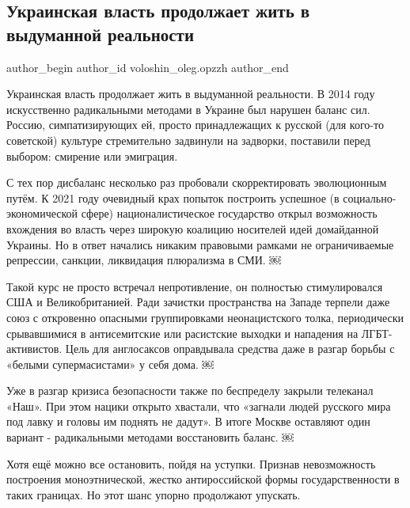  
 
 
 
 
 
\subsection{Украинская власть продолжает жить в выдуманной реальности}
\label{sec:18_02_2022.fb.voloshin_oleg.opzzh.1.ukrvlast_realnost}
 
\ifcmt
 author_begin
   author_id voloshin_oleg.opzzh
 author_end
\fi

Украинская власть продолжает жить в выдуманной реальности. В 2014 году
искусственно радикальными методами в Украине был нарушен баланс сил. Россию,
симпатизирующих ей, просто принадлежащих к русской (для кого-то советской)
культуре стремительно задвинули на задворки, поставили перед выбором: смирение
или эмиграция. 

С тех пор дисбаланс несколько раз пробовали скорректировать эволюционным путём.
К 2021 году очевидный крах попыток построить успешное (в
социально-экономической сфере) националистическое государство открыл
возможность вхождения во власть через широкую коалицию носителей идей
домайданной Украины. Но в ответ начались никаким правовыми рамками не
ограничиваемые репрессии, санкции, ликвидация плюрализма в СМИ. ￼

Такой курс не просто встречал непротивление, он полностью стимулировался США и
Великобританией. Ради зачистки пространства на Западе терпели даже союз с
откровенно опасными группировками неонацистского толка, периодически
срывавшимися в антисемитские или расистские выходки и нападения на
ЛГБТ-активистов. Цель для англосаксов оправдывала средства даже в разгар борьбы
с «белыми супермасистами» у себя дома. ￼

Уже в разгар кризиса безопасности также по беспределу закрыли телеканал «Наш».
При этом нацики открыто хвастали, что «загнали людей русского мира под лавку и
головы им поднять не дадут». В итоге Москве оставляют один вариант -
радикальными методами восстановить баланс. ￼

Хотя ещё можно все остановить, пойдя на уступки. Признав невозможность
построения моноэтнической, жестко антироссийской формы государственности в
таких границах. Но этот шанс упорно продолжают упускать.

